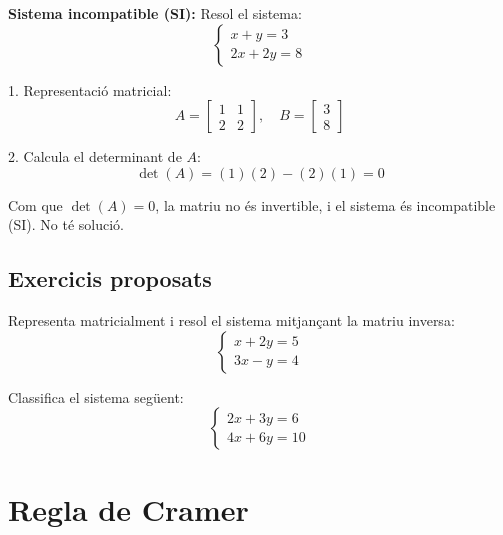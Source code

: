 \documentclass[12pt]{article}
\begin{document}
\begin{exemple}
\textbf{Sistema incompatible (SI):}
Resol el sistema:
\[
\begin{cases}
x + y = 3 \\
2x + 2y = 8
\end{cases}
\]

1. Representació matricial:
\[
A =
\begin{bmatrix}
1 & 1 \\
2 & 2
\end{bmatrix}, \quad
B =
\begin{bmatrix}
3 \\ 8
\end{bmatrix}
\]

2. Calcula el determinant de \(A\):
\[
\det(A) = (1)(2) - (2)(1) = 0
\]

Com que \(\det(A) = 0\), la matriu no és invertible, i el sistema és incompatible (SI). No té solució.
\end{exemple}

\subsection*{Exercicis proposats}

\begin{exercici}
Representa matricialment i resol el sistema mitjançant la matriu inversa:
\[
\begin{cases}
x + 2y = 5 \\
3x - y = 4
\end{cases}
\]
\end{exercici}

\begin{exercici}
Classifica el sistema següent:
\[
\begin{cases}
2x + 3y = 6 \\
4x + 6y = 10
\end{cases}
\]
\end{exercici}

\newpage

\section{Regla de Cramer}
\end{document}
